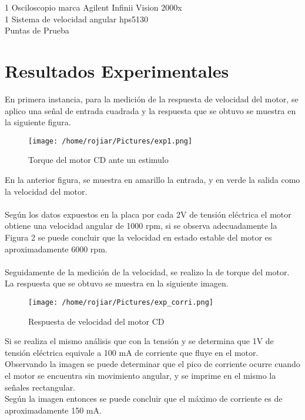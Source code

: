 \documentclass[a4paper,10pt,twocolumn]{article}
\begin{document}
1 Osciloscopio marca Agilent Infinii Vision 2000x
\\1 Sistema de velocidad angular hps5130
\\Puntas de Prueba


\section{Resultados Experimentales}

En primera instancia, para la medición de la respuesta de velocidad del motor, se aplico una señal de entrada cuadrada y la respuesta que se obtuvo 
se muestra en la siguiente figura.

\begin{figure}[h!]
\centering
\texttt{[image: /home/rojiar/Pictures/exp1.png]}
\caption{Torque del motor CD ante un estimulo}
\label{Torque del motor CD ante un estimulo}
\end{figure}

En la anterior figura, se muestra en amarillo la entrada, y en verde la salida como la velocidad del motor.
\\\\
Según los datos expuestos en la placa por cada 2V de tensión eléctrica el motor obtiene una velocidad angular de 1000 rpm, si se observa
adecuadamente la Figura 2 se puede concluir que la velocidad en estado estable del motor es aproximadamente 6000 rpm.
\\\\
Seguidamente de la medición de la velocidad, se realizo la de torque del motor. La respuesta que se obtuvo se muestra en la siguiente imagen.
\newpage

\begin{figure}[h]
\centering
\texttt{[image: /home/rojiar/Pictures/exp\_corri.png]}
\caption{Respuesta de velocidad del motor CD}
\label{Respuesta de velocidad del motor CD}
\end{figure}

Si se realiza el mismo análisis que con la tensión y se determina que 1V de tensión eléctrica equivale a 100 mA de corriente que fluye en el 
motor. Observando la imagen se puede determinar que el pico de corriente ocurre cuando el motor se encuentra sin movimiento angular, y se imprime
en el mismo la señales rectangular.\\

Según la imagen entonces se puede concluir que el máximo de corriente es de aproximadamente 150 mA.\\
\end{document}
